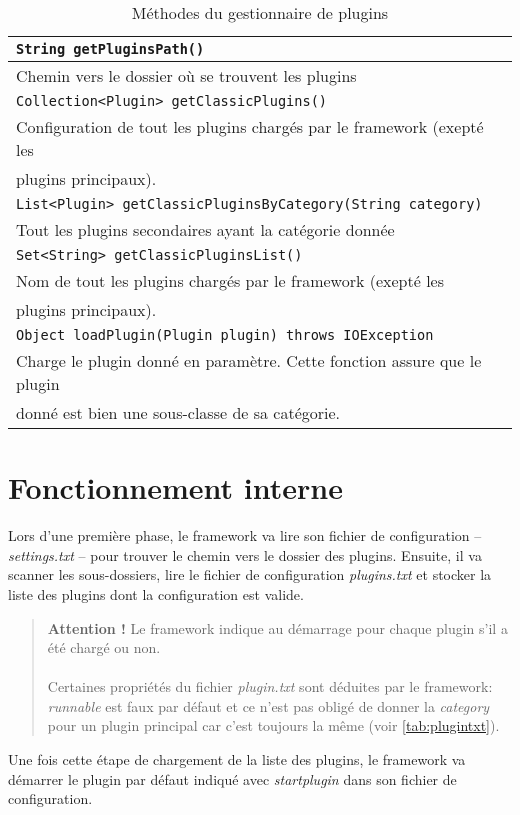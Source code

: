 \documentclass[12pt,a4paper]{article}
\begin{document}
\begin{table}[h]
	\begin{tabular}{|l|}
		\hline
		\texttt{String getPluginsPath()}\\
		\hline
		Chemin vers le dossier où se trouvent les plugins\\
		\hline			

		\hline
		\texttt{Collection<Plugin> getClassicPlugins()}\\
		\hline
		Configuration de tout les plugins chargés par le framework (exepté les\\ 
		plugins	principaux).\\
		\hline
	
		\hline
		\texttt{List<Plugin> getClassicPluginsByCategory(String category)}\\
		\hline
		Tout les plugins secondaires ayant la catégorie donnée\\
		\hline

		\hline
		\texttt{Set<String> getClassicPluginsList()}\\
		\hline
		Nom de tout les plugins chargés par le framework (exepté les \\
		plugins	principaux).\\
		\hline
			
		\hline
		\texttt{Object loadPlugin(Plugin plugin) throws IOException}\\
		\hline
		Charge le plugin donné en paramètre. Cette fonction assure que le plugin\\
		donné est bien une sous-classe de sa catégorie.\\
		\hline
	\end{tabular}	
\caption{Méthodes du gestionnaire de plugins}
\end{table}

\section{Fonctionnement interne}
Lors d'une première phase, le framework va lire son fichier de configuration -- 
\emph{settings.txt} -- pour trouver le chemin vers le dossier des plugins. 
Ensuite, il va scanner les sous-dossiers, lire le fichier de configuration 
\emph{plugins.txt} et stocker la liste des plugins dont la configuration est valide.

\begin{quote}
	\textbf{Attention !} Le framework indique au démarrage pour chaque plugin 
	s'il a été chargé ou non. 
	\\\\
	Certaines propriétés du fichier \emph{plugin.txt} sont déduites par le 
	framework: \emph{runnable} est faux par défaut et ce n'est pas obligé de 
	donner la \emph{category} pour un plugin principal car c'est toujours la 
	même (voir \ref{tab:plugintxt}).
\end{quote}

Une fois cette étape de chargement de la liste des plugins, le framework va 
démarrer le plugin par défaut indiqué avec \emph{startplugin} dans son fichier 
de configuration.
\end{document}
